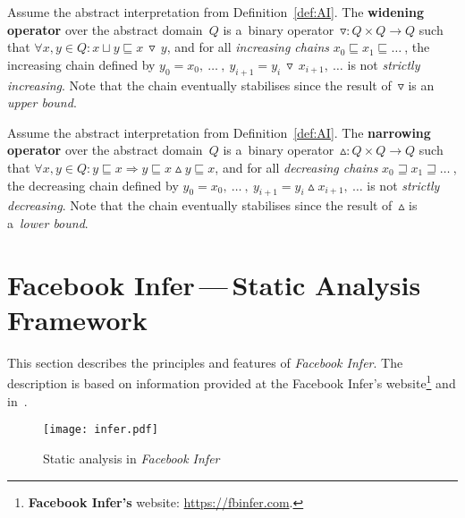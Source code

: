 \begin{definition}
    Assume the abstract interpretation from Definition~\ref{def:AI}. The \textbf{widening operator} over the abstract domain~$ Q $ is a~binary operator~$ \triangledown : Q \times Q \rightarrow Q $ such that $ \forall x, y \in Q : x \sqcup y \sqsubseteq x\,\triangledown\,y $, and for all \emph{increasing chains} $ x_0 \sqsubseteq x_1 \sqsubseteq \ldots\ $, the increasing chain defined by $ y_0 = x_0,\ \ldots\ ,\ y_{i + 1} = y_i\,\triangledown\,x_{i + 1},\ \ldots $ is not \emph{strictly increasing}. Note that the chain eventually stabilises since the result of~$ \triangledown $ is an \emph{upper bound}.
\end{definition}

\begin{definition}
    Assume the abstract interpretation from Definition~\ref{def:AI}. The \textbf{narrowing operator} over the abstract domain~$ Q $ is a~binary operator~$ \vartriangle : Q \times Q \rightarrow Q $ such that $ \forall x, y \in Q : y \sqsubseteq x \Longrightarrow y \sqsubseteq x \vartriangle y \sqsubseteq x $, and for all \emph{decreasing chains} $ x_0 \sqsupseteq x_1 \sqsupseteq \ldots\ $, the decreasing chain defined by $ y_0 = x_0,\ \ldots\ ,\ y_{i + 1} = y_i \vartriangle x_{i + 1},\ \ldots $ is not \emph{strictly decreasing}. Note that the chain eventually stabilises since the result of~$ \vartriangle $ is a~\emph{lower bound}.
\end{definition}


\section{\texorpdfstring{Facebook Infer\,---\,Static Analysis Framework}{Facebook Infer - Static Analysis Framework}}
\label{sec:fbinfer}

This section describes the principles and features of \emph{Facebook Infer}. The description is based on information provided at the Facebook Infer's website\footnote{\textbf{Facebook Infer's} website: \url{https://fbinfer.com}.} and in~\cite{inferAISpeech}.

\begin{figure}[hbt]
    \centering
    \texttt{[image: infer.pdf]}
    \caption{Static analysis in \emph{Facebook Infer}}
    \label{fig:infer}
\end{figure}

